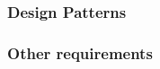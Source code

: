 \subsubsection{Design Patterns}
\label{dp:whole-system}

\subsubsection{Other requirements}
\label{others:whole-system}
